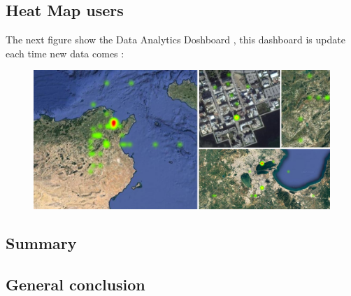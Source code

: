 \subsection{Heat Map users}
\label{sec:sec01}
The next figure show the Data Analytics Doshboard , this dashboard is update each time new data comes :
\begin{figure}[h!]
	\centering
	\includegraphics[height=0.3\textheight]{fig01/HeatMap}
	\label{fig:FilialesEtClients}
\end{figure}
\subsection{Summary}
\label{sec:sec01}

\subsection{General conclusion}
\label{sec:sec01}



